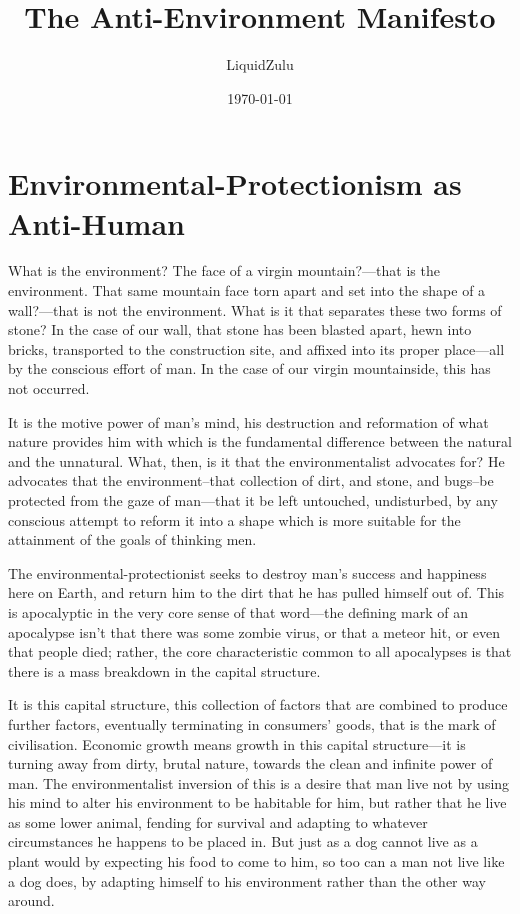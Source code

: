 \documentclass[11pt]{article}
\author{LiquidZulu}
\date{\today}
\title{The Anti-Environment Manifesto}
\begin{document}
\maketitle
\tableofcontents


\section{Environmental-Protectionism as Anti-Human}
\label{sec:org7edc647}
What is the environment? The face of a virgin mountain?---that is the environment. That same mountain face torn apart and set into the shape of a wall?---that is not the environment. What is it that separates these two forms of stone? In the case of our wall, that stone has been blasted apart, hewn into bricks, transported to the construction site, and affixed into its proper place---all by the conscious effort of man. In the case of our virgin mountainside, this has not occurred.

It is the motive power of man's mind, his destruction and reformation of what nature provides him with which is the fundamental difference between the natural and the unnatural. What, then, is it that the environmentalist advocates for? He advocates that the environment--that collection of dirt, and stone, and bugs--be protected from the gaze of man---that it be left untouched, undisturbed, by any conscious attempt to reform it into a shape which is more suitable for the attainment of the goals of thinking men.

The environmental-protectionist seeks to destroy man's success and happiness here on Earth, and return him to the dirt that he has pulled himself out of. This is apocalyptic in the very core sense of that word---the defining mark of an apocalypse isn't that there was some zombie virus, or that a meteor hit, or even that people died; rather, the core characteristic common to all apocalypses is that there is a mass breakdown in the capital structure.

It is this capital structure, this collection of factors that are combined to produce further factors, eventually terminating in consumers' goods, that is the mark of civilisation. Economic growth means growth in this capital structure---it is turning away from dirty, brutal nature, towards the clean and infinite power of man. The environmentalist inversion of this is a desire that man live not by using his mind to alter his environment to be habitable for him, but rather that he live as some lower animal, fending for survival and adapting to whatever circumstances he happens to be placed in. But just as a dog cannot live as a plant would by expecting his food to come to him, so too can a man not live like a dog does, by adapting himself to his environment rather than the other way around.
\end{document}
